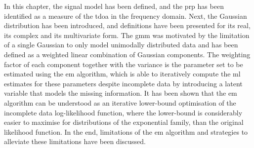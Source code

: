 \bigskip

In this chapter, the signal model has been defined, and the \gls{prp} has been identified as a measure of the \gls{tdoa} in the frequency domain. Next, the Gaussian distribution has been introduced, and definitions have been presented for its real, its complex and its multivariate form. The \gls{gmm} was motivated by the limitation of a single Gaussian to only model unimodally distributed data and has been defined as a weighted linear combination of Gaussian components. The weighting factor of each component together with the variance is the parameter set to be estimated using the \gls{em} algorithm, which is able to iteratively compute the \gls{ml} estimates for these parameters despite incomplete data by introducing a latent variable that models the missing information. It has been shown that the \gls{em} algorithm can be understood as an iterative lower-bound optimisation of the incomplete data log-likelihood function, where the lower-bound is considerably easier to maximise for distributions of the exponential family, than the original likelihood function. In the end, limitations of the \gls{em} algorithm and strategies to alleviate these limitations have been discussed.